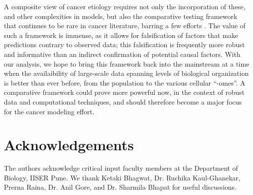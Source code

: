 \documentclass[12pt,onecolumn,twoside]{article}
\begin{document}
A composite view of cancer etiology requires not only the incorporation of these, and other complexities in models, but also the comparative testing framework that continues to be rare in cancer literature, barring a few efforts \autocite{Frank2007}. The value of such a framework is immense, as it allows for falsification of factors that make predictions contrary to observed data; this falsification is frequently more robust and informative than an indirect confirmation of potential causal factors. With our analysis, we hope to bring this framework back into the mainstream at a time when the availaibility of large-scale data spanning levels of biological organization is better than ever before, from the population to the various cellular ``-omes''. A comparative framework could prove more powerful now, in the context of robust data and computational techniques, and should therefore become a major focus for the cancer modeling effort.

\section*{Acknowledgements}
The authors acknowledge critical input faculty members at the Department of Biology, IISER Pune. We thank Ketaki Bhagwat, Dr. Ruchika Kaul-Ghanekar, Prerna Raina, Dr. Anil Gore, and Dr. Sharmila Bhapat for useful discussions.

\printbibliography
\end{document}
